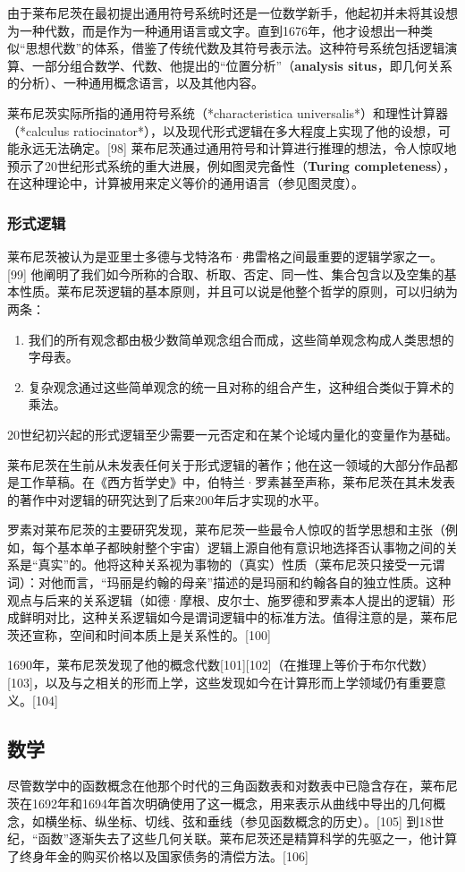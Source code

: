 由于莱布尼茨在最初提出通用符号系统时还是一位数学新手，他起初并未将其设想为一种代数，而是作为一种通用语言或文字。直到1676年，他才设想出一种类似“思想代数”的体系，借鉴了传统代数及其符号表示法。这种符号系统包括逻辑演算、一部分组合数学、代数、他提出的“位置分析”（\textbf{analysis situs}，即几何关系的分析）、一种通用概念语言，以及其他内容。

莱布尼茨实际所指的通用符号系统（*characteristica universalis*）和理性计算器（*calculus ratiocinator*），以及现代形式逻辑在多大程度上实现了他的设想，可能永远无法确定。[98] 莱布尼茨通过通用符号和计算进行推理的想法，令人惊叹地预示了20世纪形式系统的重大进展，例如图灵完备性（\textbf{Turing completeness}），在这种理论中，计算被用来定义等价的通用语言（参见图灵度）。
\subsubsection{形式逻辑} 
莱布尼茨被认为是亚里士多德与戈特洛布·弗雷格之间最重要的逻辑学家之一。[99] 他阐明了我们如今所称的合取、析取、否定、同一性、集合包含以及空集的基本性质。莱布尼茨逻辑的基本原则，并且可以说是他整个哲学的原则，可以归纳为两条：  
\begin{enumerate}
\item 我们的所有观念都由极少数简单观念组合而成，这些简单观念构成人类思想的字母表。  
\item 复杂观念通过这些简单观念的统一且对称的组合产生，这种组合类似于算术的乘法。 
\end{enumerate} 
20世纪初兴起的形式逻辑至少需要一元否定和在某个论域内量化的变量作为基础。

莱布尼茨在生前从未发表任何关于形式逻辑的著作；他在这一领域的大部分作品都是工作草稿。在《西方哲学史》中，伯特兰·罗素甚至声称，莱布尼茨在其未发表的著作中对逻辑的研究达到了后来200年后才实现的水平。

罗素对莱布尼茨的主要研究发现，莱布尼茨一些最令人惊叹的哲学思想和主张（例如，每个基本单子都映射整个宇宙）逻辑上源自他有意识地选择否认事物之间的关系是“真实”的。他将这种关系视为事物的（真实）性质（莱布尼茨只接受一元谓词）：对他而言，“玛丽是约翰的母亲”描述的是玛丽和约翰各自的独立性质。这种观点与后来的关系逻辑（如德·摩根、皮尔士、施罗德和罗素本人提出的逻辑）形成鲜明对比，这种关系逻辑如今是谓词逻辑中的标准方法。值得注意的是，莱布尼茨还宣称，空间和时间本质上是关系性的。[100]

1690年，莱布尼茨发现了他的概念代数[101][102]（在推理上等价于布尔代数）[103]，以及与之相关的形而上学，这些发现如今在计算形而上学领域仍有重要意义。[104]
\subsection{数学}
尽管数学中的函数概念在他那个时代的三角函数表和对数表中已隐含存在，莱布尼茨在1692年和1694年首次明确使用了这一概念，用来表示从曲线中导出的几何概念，如横坐标、纵坐标、切线、弦和垂线（参见函数概念的历史）。[105] 到18世纪，“函数”逐渐失去了这些几何关联。莱布尼茨还是精算科学的先驱之一，他计算了终身年金的购买价格以及国家债务的清偿方法。[106]

